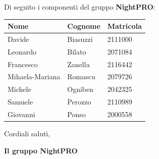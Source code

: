 \documentclass[12pt, a4paper]{article}
\begin{document}
\noindent Di seguito i componenti del gruppo \textbf{NightPRO}:
\begin{longtable}{|l|l|l|}
    \hline
    \textbf{Nome} & \textbf{Cognome} & \textbf{Matricola} \\
    \hline
    \endhead
    
    \hline
    Davide & Biasuzzi & 2111000 \\
    \hline
    Leonardo & Bilato & 2071084 \\
    \hline
    Francesco & Zanella & 2116442 \\
    \hline
    Mihaela-Mariana & Romascu & 2079726 \\
    \hline
    Michele & Ogniben & 2042325 \\
    \hline
    Samuele & Perozzo & 2110989 \\
    \hline
    Giovanni & Ponso & 2000558 \\
    \hline
\end{longtable}

\vspace{1cm}

\noindent Cordiali saluti,

\vspace{1cm}
\noindent \textbf{Il gruppo NightPRO}
\end{document}
